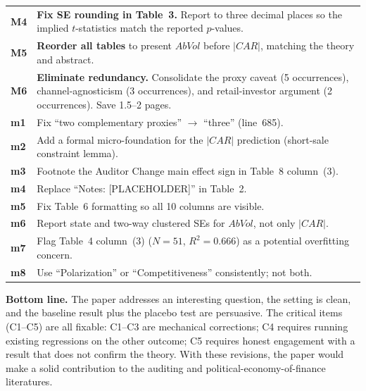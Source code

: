 \documentclass[11pt]{article}
\begin{document}
\begin{center}
\begin{tabular}{@{} p{1.1cm} p{12.2cm} @{}}
\textcolor{major}{\textbf{M4}} &
\textbf{Fix SE rounding in Table~3.} Report to three decimal places so the implied $t$-statistics match the reported $p$-values. \\

\textcolor{major}{\textbf{M5}} &
\textbf{Reorder all tables} to present $AbVol$ before $|CAR|$, matching the theory and abstract. \\

\textcolor{major}{\textbf{M6}} &
\textbf{Eliminate redundancy.} Consolidate the proxy caveat (5 occurrences), channel-agnosticism (3 occurrences), and retail-investor argument (2 occurrences). Save 1.5--2 pages. \\

\textcolor{minor}{\textbf{m1}} &
Fix ``two complementary proxies'' $\to$ ``three'' (line~685). \\

\textcolor{minor}{\textbf{m2}} &
Add a formal micro-foundation for the $|CAR|$ prediction (short-sale constraint lemma). \\

\textcolor{minor}{\textbf{m3}} &
Footnote the Auditor Change main effect sign in Table~8 column~(3). \\

\textcolor{minor}{\textbf{m4}} &
Replace ``Notes: [PLACEHOLDER]'' in Table~2. \\

\textcolor{minor}{\textbf{m5}} &
Fix Table~6 formatting so all 10 columns are visible. \\

\textcolor{minor}{\textbf{m6}} &
Report state and two-way clustered SEs for $AbVol$, not only $|CAR|$. \\

\textcolor{minor}{\textbf{m7}} &
Flag Table~4 column~(3) ($N = 51$, $R^2 = 0.666$) as a potential overfitting concern. \\

\textcolor{minor}{\textbf{m8}} &
Use ``Polarization'' or ``Competitiveness'' consistently; not both. \\
\bottomrule
\end{tabular}
\end{center}

\bigskip
\noindent\textbf{Bottom line.} The paper addresses an interesting question, the setting is clean, and the baseline result plus the placebo test are persuasive. The critical items (C1--C5) are all fixable: C1--C3 are mechanical corrections; C4 requires running existing regressions on the other outcome; C5 requires honest engagement with a result that does not confirm the theory. With these revisions, the paper would make a solid contribution to the auditing and political-economy-of-finance literatures.
\end{document}
